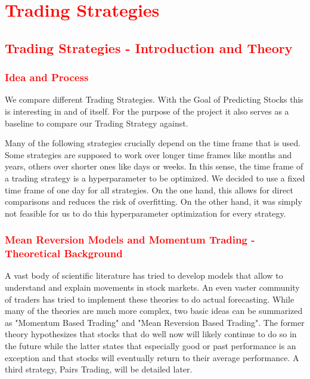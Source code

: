 \chapter{\textcolor{red}{Trading Strategies}}\label{ch:predictions}

\section{\textcolor{red}{Trading Strategies - Introduction and Theory}}
\subsection{\textcolor{red}{Idea and Process}}
We compare different Trading Strategies. With the Goal of Predicting Stocks this is interesting in and of itself. For the purpose of the project it also serves as a baseline to compare our Trading Strategy against. 

Many of the following strategies crucially depend on the time frame that is used. Some strategies are supposed to work over longer time frames like months and years, others over shorter ones like days or weeks. In this sense, the time frame of a trading strategy is a hyperparameter to be optimized. We decided to use a fixed time frame of one day for all strategies. On the one hand, this allows for direct comparisons and reduces the risk of overfitting. On the other hand, it was simply not feasible for us to do this hyperparameter optimization for every strategy. 

\subsection{\textcolor{red}{Mean Reversion Models and Momentum Trading - Theoretical Background}}

A vast body of scientific literature has tried to develop models that allow to understand and explain movements in stock markets. An even vaster community of traders has tried to implement these theories to do actual forecasting. While many of the theories are much more complex, two basic ideas can be summarized as "Momentum Based Trading" and "Mean Reversion Based Trading". The former theory hypothesizes that stocks that do well now will likely continue to do so in the future while the latter states that especially good or past performance is an exception and that stocks will eventually return to their average performance. A third strategy, Pairs Trading, will be detailed later. 

